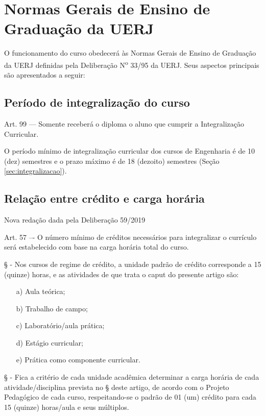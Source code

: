 \section{Normas Gerais de Ensino de Graduação da UERJ}

O funcionamento do curso obedecerá às Normas Gerais de Ensino de Graduação da UERJ definidas pela Deliberação N\textsuperscript{o} 33/95 da UERJ. Seus aspectos principais são apresentados a seguir:

\subsection{Período de integralização do curso}
\begin{quoting}
    Art. 99 –-- Somente receberá o diploma o aluno que cumprir a Integralização Curricular.
\end{quoting}

O período mínimo de integralização curricular dos cursos de Engenharia é de 10 (dez) semestres e o prazo máximo é de 18 (dezoito) semestres (Seção \ref{sec:integralizacao}).

\subsection{Relação entre crédito e carga horária}
Nova redação dada pela Deliberação  59/2019
\begin{quoting}
    Art. 57 –- O número mínimo de créditos necessários para integralizar o
    currículo será estabelecido com base na carga horária total do curso.


    \S {} - Nos cursos de regime de crédito, a unidade padrão de crédito
    corresponde a 15 (quinze) horas, e as atividades de que trata o caput do
    presente artigo são:
    \begin{itemize}
        \item[a)] Aula teórica;
        \item[b)] Trabalho de campo;
        \item[c)] Laboratório/aula prática;
        \item[d)] Estágio curricular;
        \item[e)] Prática como componente curricular.
    \end{itemize}

    \S {} - Fica a critério de cada unidade acadêmica determinar a carga horária de  cada atividade/disciplina prevista no \S{} deste artigo, de acordo com o Projeto Pedagógico de cada curso, respeitando-se o padrão de 01 (um) crédito para cada 15 (quinze) horas/aula e seus múltiplos.
\end{quoting}
